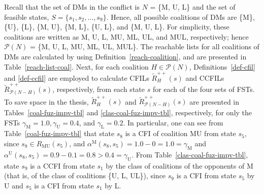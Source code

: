 Recall that the set of DMs in the conflict is $N$ = \{M, U, L\} and the set of feasible states, $S=\{s_1, s_2, ..., s_9\}$. Hence, all possible coalitions of DMs are \{M\}, \{U\}, \{L\}, \{M, U\}, \{M, L\}, \{U, L\}, and \{M, U, L\}. For simplicity, these coalitions are written as M, U, L, MU, ML, UL, and MUL, respectively; hence $\mathcal{P}(N)$ = \{M, U, L, MU, ML, UL, MUL\}. The reachable lists for all coalitions of DMs are calculated by using Definition~\ref{reach-coalition}, and are presented in Table~\ref{reach-list-coal}. Next, for each coalition $H \in \mathcal{P}(N)$, Definitions~\ref{def-cfil} and \ref{def-ccfil} are employed to calculate CFILs $\widetilde{R}_H^{++}(s)$ and CCFILs $\widetilde{R}_{\mathcal{P}(N-H)}^{++}(s)$, respectively, from each state $s$ for each of the four sets of FSTs. To save space in the thesis, $\widetilde{R}_H^{++}(s)$ and $\widetilde{R}_{\mathcal{P}(N-H)}^{++}(s)$ are presented in Tables~\ref{coal-fuz-impv-tbl} and \ref{clas-coal-fuz-impv-tbl}, respectively, for only the FSTs $\gamma_\text{M}=1.0, \gamma_\text{U}=0.4$, and $\gamma_\text{L}=0.2$. In particular, one can see from Table~\ref{coal-fuz-impv-tbl} that state $s_8$ is a CFI of coalition MU from state $s_5$, since $s_8 \in R_\text{MU}(s_5)$, and $\alpha^\text{M}(s_8, s_5)=1.0-0=1.0=\gamma_\text{M}$ and $\alpha^\text{U}(s_8, s_5)=0.9-0.1=0.8>0.4=\gamma_\text{U}$. From Table~\ref{clas-coal-fuz-impv-tbl}, state $s_9$ is a CCFI from state $s_1$ by the class of coalitions of the opponents of M (that is, of the class of coalitions \{U, L, UL\}), since $s_9$ is a CFI from state $s_5$ by U and $s_5$ is a CFI from state $s_1$ by L.

